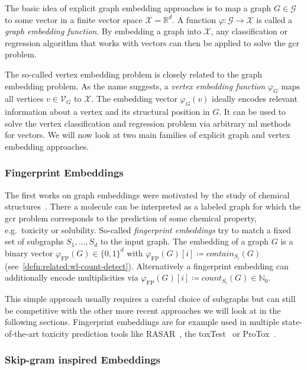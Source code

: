 The basic idea of explicit graph embedding approaches is to map a graph $G \in \mathcal{G}$ to some vector in a finite vector space $\mathcal{X} = \mathbb{R}^d$.
A function $\varphi: \mathcal{G} \to \mathcal{X}$ is called a \textit{graph embedding function}.
By embedding a graph into $\mathcal{X}$, any classification or regression algorithm that works with vectors can then be applied to solve the \ac{gcr} problem.

The so-called vertex embedding problem is closely related to the graph embedding problem.
As the name suggests, a \textit{vertex embedding function} $\varphi_G$ maps all vertices $v \in \mathcal{V}_G$ to $\mathcal{X}$.
The embedding vector $\varphi_G(v)$ ideally encodes relevant information about a vertex and its structural position in $G$.
It can be used to solve the vertex classification and regression problem via arbitrary \ac{ml} methods for vectors.
We will now look at two main families of explicit graph and vertex embedding approaches.

\subsubsection{Fingerprint Embeddings}

The first works on graph embeddings were motivated by the study of chemical structures~\cite{Adamson1973}\cite{Willett1986}.
There a molecule can be interpreted as a labeled graph for which the \ac{gcr} problem corresponds to the prediction of some chemical property, e.g.\ toxicity or solubility.
So-called \textit{fingerprint embeddings} try to match a fixed set of subgraphs $S_1, \dots, S_d$ to the input graph.
The embedding of a graph $G$ is a binary vector ${\varphi}_{\mathrm{FP}}(G) \in {\{0, 1\}}^d$ with ${\varphi}_{\mathrm{FP}}(G)[i] \coloneqq \mathit{contain}_{S_i}(G)$ (see~\cref{defn:related:wl-count-detect}).
Alternatively a fingerprint embedding can additionally encode multiplicities via ${\varphi}_{\mathrm{FP}}(G)[i] \coloneqq \mathit{count}_{S_i}(G) \in \mathbb{N}_0$.

This simple approach usually requires a careful choice of subgraphs but can still be competitive with the other more recent approaches we will look at in the following sections.
Fingerprint embeddings are for example used in multiple state-of-the-art toxicity prediction tools like RASAR~\cite{Luechtefeld2018}\cite{ToxTrack}, the \ac{toxTest}~\cite{TEST} or ProTox~\cite{Drwal2014}\cite{ProTox}\cite{Banerjee2018}.

\subsubsection{Skip-gram inspired Embeddings}

